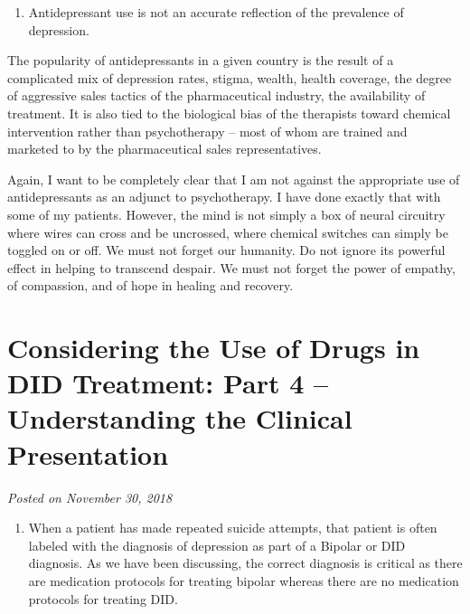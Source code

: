 \documentclass[]{book}
\providecommand{\tightlist}{%
  \setlength{\itemsep}{0pt}\setlength{\parskip}{0pt}}
\begin{document}
\begin{enumerate}
\def\labelenumi{\arabic{enumi}.}
\setcounter{enumi}{1}
\tightlist
\item
  Antidepressant use is not an accurate reflection of the prevalence of depression.
\end{enumerate}

The popularity of antidepressants in a given country is the result of a complicated mix of depression rates, stigma, wealth, health coverage, the degree of aggressive sales tactics of the pharmaceutical industry, the availability of treatment. It is also tied to the biological bias of the therapists toward chemical intervention rather than psychotherapy -- most of whom are trained and marketed to by the pharmaceutical sales representatives.

Again, I want to be completely clear that I am not against the appropriate use of antidepressants as an adjunct to psychotherapy. I have done exactly that with some of my patients. However, the mind is not simply a box of neural circuitry where wires can cross and be uncrossed, where chemical switches can simply be toggled on or off. We must not forget our humanity. Do not ignore its powerful effect in helping to transcend despair. We must not forget the power of empathy, of compassion, and of hope in healing and recovery.

\hypertarget{considering-the-use-of-drugs-in-did-treatment-part-4-understanding-the-clinical-presentation}{%
\section{Considering the Use of Drugs in DID Treatment: Part 4 -- Understanding the Clinical Presentation}\label{considering-the-use-of-drugs-in-did-treatment-part-4-understanding-the-clinical-presentation}}

\emph{Posted on November 30, 2018}

\begin{enumerate}
\def\labelenumi{\arabic{enumi}.}
\setcounter{enumi}{2}
\tightlist
\item
  When a patient has made repeated suicide attempts, that patient is often labeled with the diagnosis of depression as part of a Bipolar or DID diagnosis. As we have been discussing, the correct diagnosis is critical as there are medication protocols for treating bipolar whereas there are no medication protocols for treating DID.
\end{enumerate}
\end{document}
